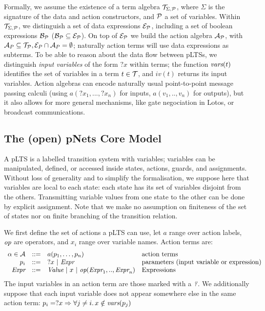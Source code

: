 \documentclass{lncs/llncs}
\begin{document}
\def\Talg{\mathcal{T}_{\Sigma,\P}}
Formally, we assume the existence of a term algebra $\Talg$,
where $\Sigma$ is the signature of the data and action constructors,
and $\P$ a set of variables. Within $\Talg$, we distinguish a set of
data expressions $\mathcal{E}_\P$, including a set of boolean
expressions $\mathcal{B}_{\P}$ ($\mathcal{B}_{\P}\subseteq\mathcal{E}_\P$).
On top of $\mathcal{E}_\P$ we build the action algebra
$\mathcal{A}_\P$, with $\mathcal{A}_P\subseteq\mathcal{T}_\P,
\mathcal{E}_P\cap\mathcal{A}_P=\emptyset$;
naturally action terms will use data expressions as subterms.
To be able to reason about the data flow between pLTSs, we
distinguish \emph{input variables} of the form $?x$ within terms; the function
$\vars(t)$ identifies the set of variables in a term
$t\in\AlgT$, and $iv(t)$ returns its input variables.
Action algebras can encode naturally usual point-to-point message passing calculi (using 
$a(?x_1,...,?x_n)$ for inputs, $a(v_1,..,v_n)$ for outputs), but it also allows
for more general mechanisms, like gate negociation in Lotos, or broadcast
communications. 



\subsection{The (open) pNets Core Model}
\label{section:pNets}


A pLTS is a labelled transition system with variables; variables can be
manipulated, defined, or accessed inside states, actions, guards, and
assignments. Without loss of generality and to simplify the formalisation, we suppose 
here that variables are local to each 
state: each state has its set of variables disjoint from the others. Transmitting 
variable values from one state to the other can be done by explicit assignment. 
Note that we make no assumption on finiteness of the set of states nor
on finite branching of the transition relation.

We first define the set of actions a pLTS can use, let $a$
range over action labels, $\symb{op}$ are operators, and $x_i$ range over
variable names. Action terms are:
\[
\begin{array}[l]{rcl@{\quad}p{5.5cm}}
  \alpha\in\AlgA&::=&a(p_1,\ldots,p_n)&\text{action terms}\\
  p_i&::=& ?x~|~\symb{Expr}&\text{parameters (input variable or expression)}\\
  \symb{Expr}&::=& \symb{Value}~|~x~|~\symb{op}(\symb{Expr}_1,..,\symb{Expr}_n)&\text{Expressions}
\end{array}
\]
The input variables in an action term are those marked with a
$\symb{?}$.
We additionally suppose that each input variable does not
appear somewhere else in the same action term:
$p_i=?x\Rightarrow\forall j\neq i.\, x\notin \vars(p_j)$
\end{document}
